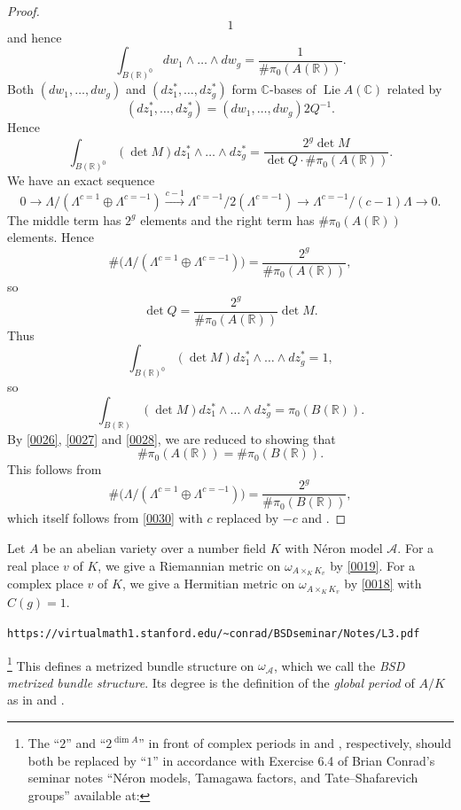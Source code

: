 \documentclass{amsart}
\theoremstyle{remark}
\numberwithin{equation}{section}
\newcommand{\R}{\mathbb{R}}
\newcommand{\C}{\mathbb{C}}
\DeclareMathOperator{\Lie}{Lie}
\begin{document}
\begin{proof}
\[				1
		\]
	and hence
		\[
				\int_{B(\R)^{0}}
					d w_{1} \wedge \dots \wedge d w_{g}
			=
				\frac{1}{\# \pi_{0}(A(\R))}.
		\]
	Both $(d w_{1}, \dots, d w_{g})$ and
	$(d z_{1}^{\ast}, \dots, d z_{g}^{\ast})$ form $\C$-bases of $\Lie A(\C)$
	related by
		\[
				(d z_{1}^{\ast}, \dots, d z_{g}^{\ast})
			=
				(d w_{1}, \dots, d w_{g}) 2 Q^{-1}.
		\]
	Hence
		\[
				\int_{B(\R)^{0}}
					(\det M) d z_{1}^{\ast} \wedge \dots \wedge d z_{g}^{\ast}
			=
				\frac{2^{g} \det M}{\det Q \cdot \# \pi_{0}(A(\R))}.
		\]
	We have an exact sequence
		\[
				0
			\to
				\Lambda / (\Lambda^{c = 1} \oplus \Lambda^{c = -1})
			\stackrel{c - 1}{\to}
				\Lambda^{c = -1} / 2 (\Lambda^{c = -1})
			\to
				\Lambda^{c = -1} / (c - 1) \Lambda
			\to
				0.
		\]
	The middle term has $2^{g}$ elements
	and the right term has $\# \pi_{0}(A(\R))$ elements.
	Hence
		\begin{equation} \label{0030}
				\# \bigl(
					\Lambda / (\Lambda^{c = 1} \oplus \Lambda^{c = -1})
				\bigr)
			=
				\frac{2^{g}}{\# \pi_{0}(A(\R))},
		\end{equation}
	so
		\[
				\det Q
			=
				\frac{2^{g}}{\# \pi_{0}(A(\R))} \det M.
		\]
	Thus
		\[
				\int_{B(\R)^{0}}
					(\det M) d z_{1}^{\ast} \wedge \dots \wedge d z_{g}^{\ast}
			=
				1,
		\]
	so
		\begin{equation} \label{0028}
				\int_{B(\R)}
					(\det M) d z_{1}^{\ast} \wedge \dots \wedge d z_{g}^{\ast}
			=
				\pi_{0}(B(\R)).
		\end{equation}
	By \eqref{0026}, \eqref{0027} and \eqref{0028},
	we are reduced to showing that
		\[
				\# \pi_{0}(A(\R))
			=
				\# \pi_{0}(B(\R)).
		\]
	This follows from
		\[
				\# \bigl(
					\Lambda / (\Lambda^{c = 1} \oplus \Lambda^{c = -1})
				\bigr)
			=
				\frac{2^{g}}{\# \pi_{0}(B(\R))},
		\]
	which itself follows from \eqref{0030} with $c$ replaced by $- c$
	and \cite[Chapter I, Remark 3.7]{Mil06}.
\end{proof}

Let $A$ be an abelian variety over a number field $K$
with N\'eron model $\mathcal{A}$.
For a real place $v$ of $K$,
we give a Riemannian metric on $\omega_{A \times_{K} K_{v}}$
by \eqref{0019}.
For a complex place $v$ of $K$,
we give a Hermitian metric on $\omega_{A \times_{K} K_{v}}$
by \eqref{0018} with $C(g) = 1$.%
\begin{lrbox}\myVerb%
    \footnotesize\verb|https://virtualmath1.stanford.edu/~conrad/BSDseminar/Notes/L3.pdf|%
\end{lrbox}%
\footnote{
	The ``$2$'' and ``$2^{\dim A}$''
	in front of complex periods in
	\cite[Conjecture 2.1 (2)]{DD10}
	and \cite[Definition 2.1]{DD15}, respectively,
	should both be replaced by ``$1$''
	in accordance with Exercise 6.4 of Brian Conrad's seminar notes
	``N\'eron models, Tamagawa factors, and Tate--Shafarevich groups''
	available at:
    \par\noindent
    \usebox\myVerb
}
This defines a metrized bundle structure on $\omega_{\mathcal{A}}$,
which we call the \emph{BSD metrized bundle structure}.
Its degree is the definition of the \emph{global period} of $A / K$
as in \cite[Conjecture 2.1 (2)]{DD10} and \cite[Definition 2.1]{DD15}.
\end{document}
